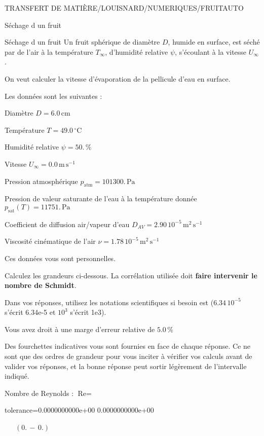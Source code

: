 \documentclass[12pt]{article}
\begin{document}
\begin{quiz}{TRANSFERT DE MATIÈRE/LOUISNARD/NUMERIQUES/FRUITAUTO}
\begin{cloze}{Séchage d un fruit}
\end{cloze} 


 \begin{cloze}{Séchage d un fruit} 
Un fruit sphérique de diamètre $D$, humide en surface, est séché par de l'air à la température $T_\infty$, d'humidité relative $\psi$, s'écoulant à la vitesse $U_\infty$.

On veut calculer la vitesse d'évaporation de la pellicule d'eau en surface.

 

Les données sont les suivantes :

 

Diamètre $D = 6.0\,  \mathrm{cm} $

Température $T = 49.0\,  \mathrm{^\circ\mathrm{C}} $

Humidité relative $\psi = 50.\, \% $

Vitesse $U_\infty = 0.0\,  \mathrm{m}\,  \mathrm{s}^{-1} $

Pression atmosphérique $p_{\text{atm}} = 101300.\,  \mathrm{Pa} $

Pression de valeur saturante de l’eau à la température donnée $p_{\text{sat}}(T) = 11751.\,  \mathrm{Pa} $

Coefficient de diffusion air/vapeur d’eau $D_{AV} =  2.90 \, 10^{-5} \,  \mathrm{m}^{2}\,  \mathrm{s}^{-1} $

Viscosité cinématique de l’air $\nu =  1.78 \, 10^{-5} \,  \mathrm{m}^{2}\,  \mathrm{s}^{-1} $

Ces données vous sont personnelles.

 

Calculez les grandeurs ci-dessous. La corrélation utilisée doit \textbf{faire intervenir le nombre de Schmidt}.

Dans vos réponses, utilisez les notations scientifiques si besoin est ($6.34\, 10^{-5}$ s'écrit 6.34e-5 et $10^{3}$ s'écrit 1e3).

Vous avez droit à une marge d'erreur relative de $5.0\, \% $

Des fourchettes indicatives vous sont fournies en face de chaque réponse. Ce ne sont que des ordres de grandeur pour vous inciter à vérifier vos calculs avant de valider vos réponses, et la bonne réponse peut sortir légèrement de l'intervalle indiqué.

 

Nombre de Reynolds : $\text{Re} =  $
\begin{numerical}[points=1] 
\item[tolerance={0.0000000000e+00}] 0.0000000000e+00 
\end{numerical} 
 $\,$ 
 $ \quad (0. \, - \, 0.) $ 


\end{cloze}
\end{quiz}
\end{document}
